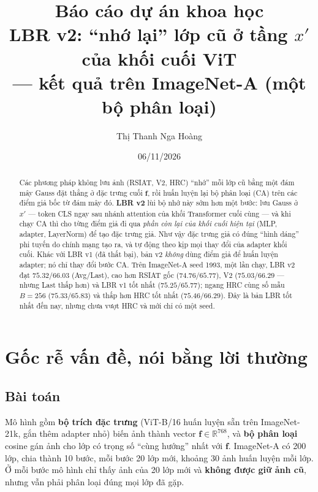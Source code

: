 \documentclass[11pt]{article}
\title{Báo cáo dự án khoa học\\[4pt]
\large LBR v2: ``nhớ lại'' lớp cũ ở tầng $x'$ của khối cuối ViT\\
--- kết quả trên ImageNet-A (một bộ phân loại)}
\author{Thị Thanh Nga Hoàng}
\date{06/11/2026}
\newcommand{\R}{\mathbb{R}}
\newcommand{\vf}{\mathbf{f}}
\begin{document}
\maketitle

\begin{abstract}
Các phương pháp không lưu ảnh (RSIAT, V2, HRC) ``nhớ'' mỗi lớp cũ bằng một đám mây Gauss đặt thẳng ở đặc trưng cuối
$\vf$, rồi huấn luyện lại bộ phân loại (CA) trên các điểm giả bốc từ đám mây đó. \textbf{LBR v2} lùi bộ nhớ này sớm hơn
một bước: lưu Gauss ở $x'$ --- token CLS ngay sau nhánh attention của khối Transformer cuối cùng --- và khi chạy CA thì
cho từng điểm giả đi qua \emph{phần còn lại của khối cuối hiện tại} (MLP, adapter, LayerNorm) để tạo đặc trưng giả. Như
vậy đặc trưng giả có đúng ``hình dáng'' phi tuyến do chính mạng tạo ra, và tự động theo kịp mọi thay đổi của adapter
khối cuối. Khác với LBR v1 (đã thất bại), bản v2 \emph{không} dùng điểm giả để huấn luyện adapter; nó chỉ thay đổi bước
CA. Trên ImageNet-A seed 1993, một lần chạy, LBR v2 đạt $\mathbf{75.32/66.03}$ (Avg/Last), cao hơn RSIAT gốc
($74.76/65.77$), V2 ($75.03/66.29$ --- nhưng Last thấp hơn) và LBR v1 tốt nhất ($75.25/65.77$); ngang HRC cùng số mẫu
$B=256$ ($75.33/65.83$) và thấp hơn HRC tốt nhất ($75.46/66.29$). Đây là bản LBR tốt nhất đến nay, nhưng chưa vượt HRC
và mới chỉ có một seed.
\end{abstract}

\tableofcontents
\newpage

\section{Gốc rễ vấn đề, nói bằng lời thường}

\subsection{Bài toán}
Mô hình gồm \textbf{bộ trích đặc trưng} (ViT-B/16 huấn luyện sẵn trên ImageNet-21k, gắn thêm adapter nhỏ) biến ảnh
thành vector $\vf\in\R^{768}$, và \textbf{bộ phân loại} cosine gán ảnh cho lớp có trọng số ``cùng hướng'' nhất với
$\vf$. ImageNet-A có 200 lớp, chia thành 10 bước, mỗi bước 20 lớp mới, khoảng 30 ảnh huấn luyện mỗi lớp. Ở mỗi bước mô
hình chỉ thấy ảnh của 20 lớp mới và \textbf{không được giữ ảnh cũ}, nhưng vẫn phải phân loại đúng mọi lớp đã gặp.
\end{document}
